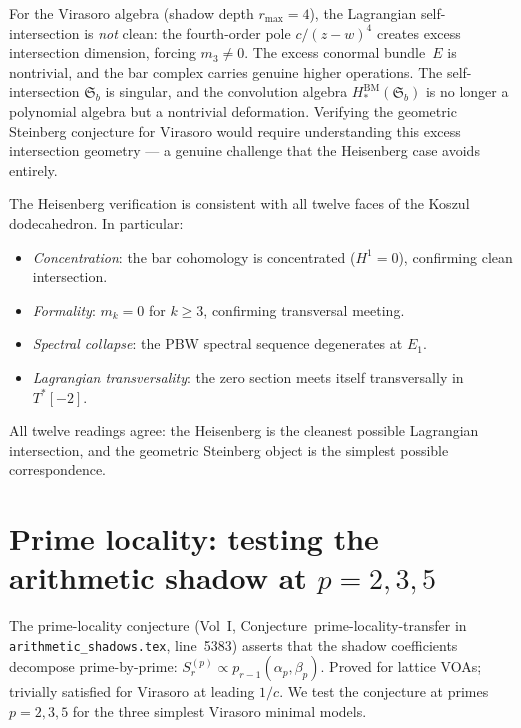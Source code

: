 \documentclass[11pt]{article}
\begin{document}
\begin{remark}
For the Virasoro algebra (shadow depth $r_{\max} = 4$), the
Lagrangian self-intersection is \emph{not} clean:
the fourth-order pole $c/(z-w)^4$ creates excess intersection
dimension, forcing $m_3 \ne 0$.  The excess conormal bundle~$E$ is
nontrivial, and the bar complex carries genuine higher operations.
The self-intersection $\mathfrak{S}_b$ is singular, and the
convolution algebra $H_*^{\mathrm{BM}}(\mathfrak{S}_b)$ is no longer
a polynomial algebra but a nontrivial deformation.  Verifying the
geometric Steinberg conjecture for Virasoro would require
understanding this excess intersection geometry --- a genuine
challenge that the Heisenberg case avoids entirely.
\end{remark}

\begin{remark}
The Heisenberg verification is consistent with all twelve faces of
the Koszul dodecahedron.  In particular:
\begin{itemize}[leftmargin=1.8em]
\item \emph{Concentration}: the bar cohomology is concentrated
  ($H^1 = 0$), confirming clean intersection.
\item \emph{Formality}: $m_k = 0$ for $k \ge 3$, confirming
  transversal meeting.
\item \emph{Spectral collapse}: the PBW spectral sequence
  degenerates at $E_1$.
\item \emph{Lagrangian transversality}: the zero section meets
  itself transversally in $T^*[-2]$.
\end{itemize}
All twelve readings agree: the Heisenberg is the cleanest possible
Lagrangian intersection, and the geometric Steinberg object is the
simplest possible correspondence.
\end{remark}


\section{Prime locality: testing the arithmetic shadow at $p=2,3,5$}
\label{sec:prime-locality-test}

The prime-locality conjecture (Vol~I,
Conjecture~prime-locality-transfer in
\texttt{arithmetic\_shadows.tex}, line~5383) asserts that the
shadow coefficients decompose prime-by-prime:
$S_r^{(p)} \propto p_{r-1}(\alpha_p, \beta_p)$.  Proved for
lattice VOAs; trivially satisfied for Virasoro at leading $1/c$.
We test the conjecture at primes $p = 2, 3, 5$ for the three
simplest Virasoro minimal models.
\end{document}

